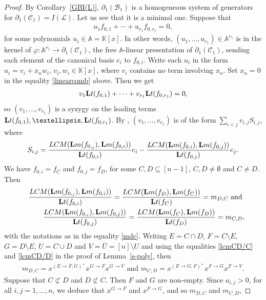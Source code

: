 \documentclass[10pt]{amsart}
\newcommand{\mbk}{\mbox{$\mathbb{K}$}}
\newcommand{\mba}{\mbox{$\mathbb{A}$}}
\newcommand{\lm}{\mbox{${\bf L}{\rm m}$}}
\newcommand{\lt}{\mbox{${\bf L}{\rm t}$}}
\newcommand{\mcb}{\mbox{$\mathcal{B}$}}
\newcommand{\mcc}{\mbox{$\mathcal{C}$}}
\newcommand{\mcl}{\mbox{$\mathcal{L}$}}
\newcommand{\dif}{\mbox{$\partial$}}
\newcommand{\Lcm}{\mbox{${\rm LCM}$}}
\theoremstyle{definition}
\theoremstyle{remark}
\begin{document}
\begin{proof}
By Corollary~\ref{GBI(L)}, $\dif_1(\mcb_1)$ is a homogeneous system of
generators for $\dif_1(\mcc_1)=I(\mcl)$. Let us see that it is a
minimal one.  Suppose that
\begin{eqnarray}\label{linearcomb}
u_1f_{0,1}+\cdots +u_{r_1}f_{0,r_1}=0,
\end{eqnarray}
for some polynomials $u_i\in \mba=\mbk[x]$. In other words,
$(u_1,\ldots ,u_{r_1})\in\mba^{r_1}$ is in the kernel of
$\varphi:\mba^{r_1}\to \dif_1(\mcc_1)$, the free $\mba$-linear
presentation of $\dif_1(\mcc_1)$, sending each element of the
canonical basis $e_i$ to $f_{0,i}$. Write each $u_i$ in the form
$u_i=v_i+x_nw_i$, $v_i,w_i\in\mbk[x]$, where $v_i$ contains no term
involving $x_n$. Set $x_n=0$ in the equality \eqref{linearcomb}
above. Then we get
\begin{eqnarray*}
v_1\lt(f_{0,1})+\cdots + v_{r_1}\lt(f_{0,r_1})=0,
\end{eqnarray*}
so $(v_1,\ldots ,v_{r_1})$ is a syzygy on the leading terms
$\lt(f_{0,1}),\ldots ,\lt(f_{0,r_1})$.  By
\cite[\S~2.9. Proposition~8, see also Definition~5]{clo}, $(v_1,\ldots
,v_{r_1})$ is of the form $\sum_{i<j}v_{i,j}S_{i,j}$, where
\begin{eqnarray*}
S_{i,j}=\frac{\Lcm(\lm(f_{0,_j}),\lm(f_{0,i}))}{\lt(f_{0,i})}e_i-
\frac{\Lcm(\lm(f_{0,i}),\lm(f_{0,j}))}{\lt(f_{0,j})}e_j.
\end{eqnarray*}
We have $f_{0,i}=f_C$ and $f_{0,j}=f_D$, for some $C,D\subseteq
[n-1]$, $C,D\neq \emptyset$ and $C\neq D$. Then
\begin{eqnarray*}
&&\frac{\Lcm(\lm(f_{0,_j}),\lm(f_{0,i}))}{\lt(f_{0,i})}=
\frac{\Lcm(\lm(f_D),\lm(f_C))}{\lt(f_C)}=m_{D,C}\mbox{ and }
\\&& \frac{\Lcm(\lm(f_{0,_i}),\lm(f_{0,j}))}{\lt(f_{0,j})}=
\frac{\Lcm(\lm(f_C),\lm(f_D))}{\lt(f_D)}=m_{C,D},
\end{eqnarray*}
with the notations as in the equality \eqref{mdc}. Writing $E=C\cap
D$, $F=C\setminus E$, $G=D\setminus E$, $U=C\cup D$ and
$V=\overline{U}=[n]\setminus U$ and using the equalities
\eqref{lcmCD/C} and \eqref{lcmCD/D} in the proof of
Lemma~\ref{s-poly}, then
\begin{eqnarray*}
m_{D,C}=x^{(E\to F,G)^{+}}x^{G\to F}x^{G\to V}\mbox{ and }
m_{C,D}=x^{(E\to G,F)^{+}}x^{F\to G}x^{F\to V}.
\end{eqnarray*}
Suppose that $C\not\subset D$ and $D\not\subset C$. Then $F$ and $G$
are non-empty. Since $a_{i,j}>0$, for all $i,j=1,\ldots ,n$, we deduce
that $x^{G\to F}$ and $x^{F\to G}$, and so $m_{D,C}$ and $m_{C,D}$,

\end{proof}
\end{document}
